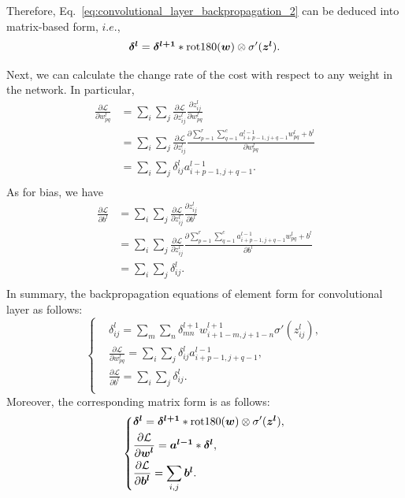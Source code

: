 \documentclass[10pt,onecolumn]{book}
\newcommand{\bm}[1]{\mbox{\boldmath{$#1$}}}
\begin{document}
Therefore, Eq.~\ref{eq:convolutional_layer_backpropagation_2} can be deduced into matrix-based form, $i.e.$,
\begin{equation}
\bm{\delta^l} = \bm{\delta^{l+1}}*\mathrm{rot180}(\bm{w}) \otimes \sigma'(\bm{z^l}).
\end{equation}

Next, we can calculate the change rate of the cost with respect to any weight in the network. In particular, 
\begin{equation}
\begin{split}
\frac{\partial \mathcal{L}}{\partial w^l_{pq}} &= \sum_i \sum_j \frac{\partial \mathcal{L}}{\partial z^l_{ij}} \frac{\partial z^l_{ij}}{\partial w^l_{pq}} 
\\
&= \sum_i \sum_j \frac{\partial \mathcal{L}}{\partial z^l_{ij}} \frac{\partial \sum^r_{p=1} \sum^c_{q=1}  a^{l-1}_{i+p-1, j+q-1} w^l_{pq} + b^l}{\partial w^l_{pq}} 
\\
&= \sum_i \sum_j \delta^l_{ij} a^{l-1}_{i+p-1,j+q-1}. \\
\end{split} 
\tag{CONV-BP3}
\end{equation}
As for bias, we have 
\begin{equation}
\begin{split}
\frac{\partial \mathcal{L}}{\partial b^l} &= \sum_i \sum_j \frac{\partial \mathcal{L}}{\partial z^l_{ij}} \frac{\partial z^l_{ij}}{\partial b^l} 
\\
&= \sum_i \sum_j \frac{\partial \mathcal{L}}{\partial z^l_{ij}} \frac{\partial \sum^r_{p=1} \sum^c_{q=1}  a^{l-1}_{i+p-1, j+q-1} w^l_{pq} + b^l}{\partial b^l} 
\\
&= \sum_i \sum_j \delta^l_{ij}. \\
\end{split} 
\tag{CONV-BP4}
\end{equation}
In summary, the backpropagation equations of element form for convolutional layer as follows:
\begin{equation}
\left\{
\begin{split}
& \delta^l_{ij} = \sum_m \sum_n \delta^{l+1}_{mn} w^{l+1}_{i+1-m,j+1-n} \sigma'(z^l_{ij}), \\
& \frac{\partial \mathcal{L}}{\partial w^l_{pq}} = \sum_i \sum_j \delta^l_{ij} a^{l-1}_{i+p-1,j+q-1}, \\
& \frac{\partial \mathcal{L}}{\partial b^l} = \sum_i \sum_j \delta^l_{ij}. \\
\end{split}
\right.
\tag{CONV-BP}
\end{equation}
Moreover, the corresponding matrix form is as follows:
\begin{equation}
\left\{
\begin{split}
& \bm{\delta^l} = \bm{\delta^{l+1}}*\mathrm{rot180}(\bm{w}) \otimes \sigma'(\bm{z^l}), \\
& \frac{\partial \mathcal{L}}{\partial \bm{w^l}} = \bm{a^{l-1}}*\bm{\delta^l}, \\
& \frac{\partial \mathcal{L}}{\partial \bm{b^l}} = \sum_{i,j}\bm{b^l}.
\end{split}
\right.
\end{equation}
\end{document}
